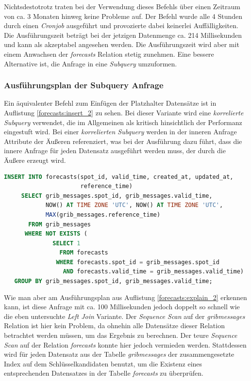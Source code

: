 Nichtsdestotrotz traten bei der Verwendung dieses Befehls über einen
Zeitraum von ca. 3 Monaten hinweg keine Probleme auf. Der Befehl wurde
alle 4 Stunden durch einen \textit{Cronjob} ausgeführt und provozierte
dabei keinerlei Auffälligkeiten. Die Ausführungszeit beträgt bei der
jetzigen Datenmenge ca. 214 Millisekunden und kann als akzeptabel
angesehen werden. Die Ausführungszeit wird aber mit einem Anwachsen
der \textit{forecasts} Relation stetig zunehmen. Eine bessere
Alternative ist, die Anfrage in eine \textit{Subquery} umzuformen.

\subsubsection{Ausführungsplan der Subquery Anfrage}
Ein äquivalenter Befehl zum Einfügen der Platzhalter Datensätze ist in
Auflistung \ref{forecasts:insert_2} zu sehen. Bei dieser Variante wird
eine \textit{korrelierte Subquery} verwendet, die im Allgemeinen als
kritisch hinsichtlich der Performanz eingestuft wird. Bei einer
\textit{korrelierten Subquery} werden in der inneren Anfrage Attribute
der Äußeren referenziert, was bei der Ausführung dazu führt, dass die
innere Anfrage für jeden Datensatz ausgeführt werden muss, der durch
die Äußere erzeugt wird.

\begin{lstlisting}[captionpos=b, caption=Hinzufügen von Datensätzen mittels Subquery, label=forecasts:insert_2, language=SQL]
INSERT INTO forecasts(spot_id, valid_time, created_at, updated_at, 
                      reference_time)
     SELECT grib_messages.spot_id, grib_messages.valid_time, 
            NOW() AT TIME ZONE 'UTC', NOW() AT TIME ZONE 'UTC', 
            MAX(grib_messages.reference_time)
       FROM grib_messages
      WHERE NOT EXISTS (
              SELECT 1 
                FROM forecasts 
               WHERE forecasts.spot_id = grib_messages.spot_id
                 AND forecasts.valid_time = grib_messages.valid_time)
   GROUP BY grib_messages.spot_id, grib_messages.valid_time;
\end{lstlisting}

Wie man aber am Ausführungsplan aus Auflistung
\ref{forecasts:explain_2} erkennen kann, ist diese Anfrage mit ca. 100
Millisekunden jedoch doppelt so schnell wie die eben untersuchte
\textit{Left Join} Variante. Der \textit{Sequence Scan} auf der
\textit{grib\textunderscore messages} Relation ist hier kein Problem,
da ohnehin alle Datensätze dieser Relation betrachtet werden müssen,
um das Ergebnis zu berechnen. Der teure \textit{Sequence Scan} auf der
Relation \textit{forecasts} konnte hier jedoch vermieden
werden. Stattdessen wird für jeden Datensatz aus der Tabelle
\textit{grib\textunderscore messages} der zusammengesetzte Index auf
dem Schlüsselkandidaten benutzt, um die Existenz eines entsprechenden
Datensatzes in der Tabelle \textit{forecasts} zu überprüfen.

